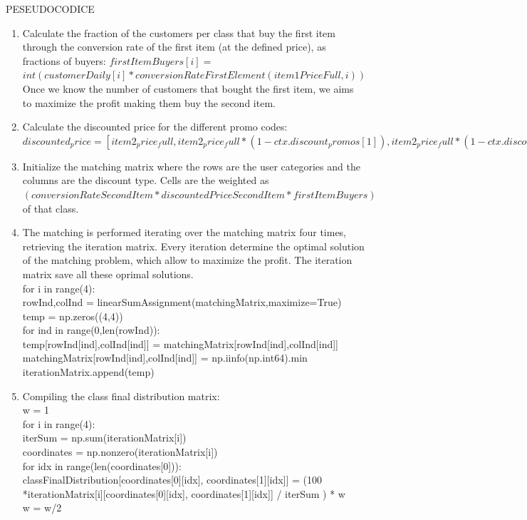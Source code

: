 PESEUDOCODICE
\begin{enumerate}
	\item Calculate the fraction of the customers per class that buy the first item through the conversion rate of the first item (at the defined price), as fractions of buyers: $firstItemBuyers[i]=$\\
	$int (customerDaily[i] * conversionRateFirstElement(item1PriceFull, i))$\\
	Once we know the number of customers that bought the first item, we aims to maximize the profit making them buy the second item.
	\item Calculate the discounted price for the different promo codes: $discounted_price = [item2_price_full, item2_price_full*(1-ctx.discount_promos[1]),	item2_price_full*(1-ctx.discount_promos[2]),item2_price_full*(1-ctx.discount_promos[3])]$
	\item Initialize the matching matrix where the rows are the user categories and the columns are the discount type. Cells are the weighted as $(conversionRateSecondItem * discountedPriceSecondItem * firstItemBuyers)$ of that class.
	\item The matching is performed iterating over the matching matrix four times, retrieving the iteration matrix. Every iteration determine the optimal solution of the matching problem, which allow to maximize the profit. The iteration matrix save all these oprimal solutions.\\
	
	for i in range(4):\\
	\tabto{0.6cm} rowInd,colInd = linearSumAssignment(matchingMatrix,maximize=True)\\
	\tabto{0.6cm} temp = np.zeros((4,4))\\
	\tabto{0.6cm}for ind in range(0,len(rowInd)):\\
	\tabto{1.2cm}temp[rowInd[ind],colInd[ind]] =  matchingMatrix[rowInd[ind],colInd[ind]]\\
	\tabto{1.2cm}matchingMatrix[rowInd[ind],colInd[ind]] = np.iinfo(np.int64).min \\
	\tabto{0.6cm}iterationMatrix.append(temp)
	\item Compiling the class final distribution matrix:\\
	w = 1\\
	for i in range(4):\\
	\tabto{0.6cm}iterSum = np.sum(iterationMatrix[i])\\
	\tabto{0.6cm}coordinates = np.nonzero(iterationMatrix[i])\\
	\tabto{0.6cm}for idx in range(len(coordinates[0])):\\
	\tabto{1.2cm}classFinalDistribution[coordinates[0][idx], coordinates[1][idx]] =
	\tabto{1.2cm}(100 *iterationMatrix[i][coordinates[0][idx], coordinates[1][idx]] /
	\tabto{1.2cm} iterSum ) * w\\
	\tabto{0.6cm}w = w/2\\
	

\end{enumerate}
